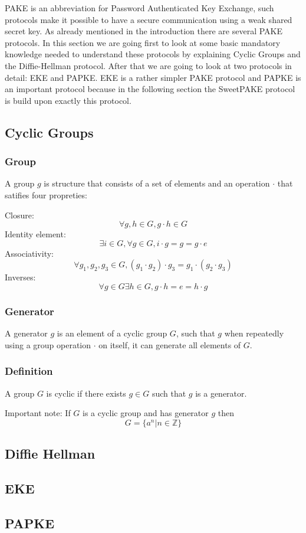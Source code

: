 \documentclass[../main.tex]{subfiles}
\begin{document}
PAKE is an abbreviation for Password Authenticated Key Exchange, such protocols
make it possible to have a secure communication using a weak shared secret key.
As already mentioned in the introduction there are several PAKE protocols. In
this section we are going first to look at some basic mandatory knowledge
needed to understand these protocols by explaining Cyclic Groups and the
Diffie-Hellman protocol. After that we are going to look at two protocols in
detail: EKE and PAPKE. EKE is a rather simpler PAKE protocol and PAPKE is an
important protocol because in the following section the SweetPAKE protocol is
build upon exactly this protocol.

\subsection{Cyclic Groups}

\subsubsection{Group}
A group \(g\) is structure that consists of a set of elements and an operation \(\cdot\)
that satifies four propreties: 

Closure: \[\forall g, h \in G,  g \cdot h \in G\]
Identity element: \[\exists i \in G, \forall g \in G, i \cdot g = g =
g \cdot e\]
Associativity: \[\forall g_1, g_2, g_3 \in G, (g_1 \cdot g_2) \cdot g_3 = g_1
\cdot (g_2 \cdot g_3)\]
Inverses:\[\forall g \in G \exists h \in G, g \cdot h = e = h \cdot g\]

\subsubsection{Generator}
A generator \(g\) is an element of a cyclic group \(G\), such that \(g\) when repeatedly using
a group operation \(\cdot\) on itself, it can generate all elements of \(G\).

\subsubsection{Definition} A group \(G\) is cyclic if there exists \(g \in G\)
such that \(g\) is a generator.

Important note: If \(G\) is a cyclic group and has generator \(g\) then \[G =
\{a^n | n \in \mathbb{Z}\}\]


\subsection{Diffie Hellman}
\subsection{EKE}
\subsection{PAPKE}
\end{document}
